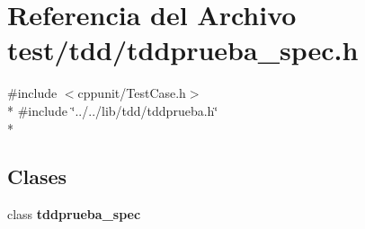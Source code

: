 \section{Referencia del Archivo test/tdd/tddprueba\+\_\+spec.h}
\label{tddprueba__spec_8h}
{\ttfamily \#include $<$cppunit/\+Test\+Case.\+h$>$}\\*
{\ttfamily \#include \char`\"{}../../lib/tdd/tddprueba.\+h\char`\"{}}\\*
\subsection*{Clases}
\begin{DoxyCompactItemize}
\item 
class {\bf tddprueba\+\_\+spec}
\end{DoxyCompactItemize}
